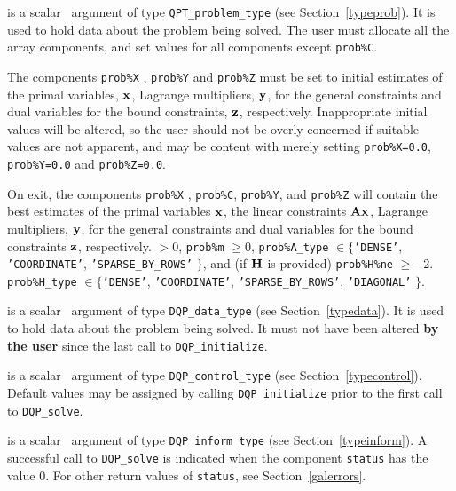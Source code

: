 \documentclass{galahad}
\newcommand{\packagename}{DQP}
\begin{document}
\begin{description}
 is a scalar \intentinout\ argument of type
{\tt QPT\_problem\_type}
(see Section~\ref{typeprob}).
It is used to hold data about the problem being solved.
The user must allocate all the array components,
and set values for all components  except {\tt prob\%C}.

The components {\tt prob\%X} , {\tt prob\%Y} and {\tt prob\%Z}
must be set to initial estimates of the primal variables, ${\mathbf{x}}$,
Lagrange multipliers, ${\mathbf{y}}$, for the general constraints
and dual variables for the bound constraints, ${\mathbf{z}}$, respectively.
Inappropriate initial values will be altered, so the user should
not be overly concerned if suitable values are not apparent, and may be
content with merely setting {\tt prob\%X=0.0}, {\tt prob\%Y=0.0}
and {\tt prob\%Z=0.0}.

On exit, the components {\tt prob\%X} , {\tt prob\%C}, {\tt prob\%Y},
and {\tt prob\%Z}
will contain the best estimates of the primal variables ${\mathbf{x}}$,
the linear constraints ${\mathbf{A}} {\mathbf{x}}$,
Lagrange multipliers, ${\mathbf{y}}$, for the general constraints
and dual variables for the bound constraints ${\mathbf{z}}$, respectively.
 $> 0$, {\tt prob\%m} $\geq 0$,
 {\tt prob\%A\_type} $\in \{${\tt 'DENSE'},
 {\tt 'COORDINATE'}, {\tt 'SPARSE\_BY\_\-ROWS'} $\}$,
              and (if ${\mathbf{H}}$ is provided) {\tt prob\%H\%ne} $\geq -2$.
 {\tt prob\%H\_type} $\in \{${\tt 'DENSE'},
 {\tt 'COORDINATE'}, {\tt 'SPARSE\_BY\_\-ROWS'}, {\tt 'DIAGONAL'} $\}$.

 is a scalar \intentinout\ argument of type
{\tt \packagename\_data\_type}
(see Section~\ref{typedata}). It is used to hold data about the problem being
solved. It must not have been altered {\bf by the user} since the last call to
{\tt \packagename\_initialize}.

 is a scalar \intentin\ argument of type
{\tt \packagename\_control\_type}
(see Section~\ref{typecontrol}). Default values may be assigned by calling
{\tt \packagename\_initialize} prior to the first call to
{\tt \packagename\_solve}.

 is a scalar \intentinout\ argument of type
{\tt \packagename\_inform\_type}
(see Section~\ref{typeinform}).
A successful call to
{\tt \packagename\_solve}
is indicated when the  component {\tt status} has the value 0.
For other return values of {\tt status}, see Section~\ref{galerrors}.


\end{description}
\end{document}
